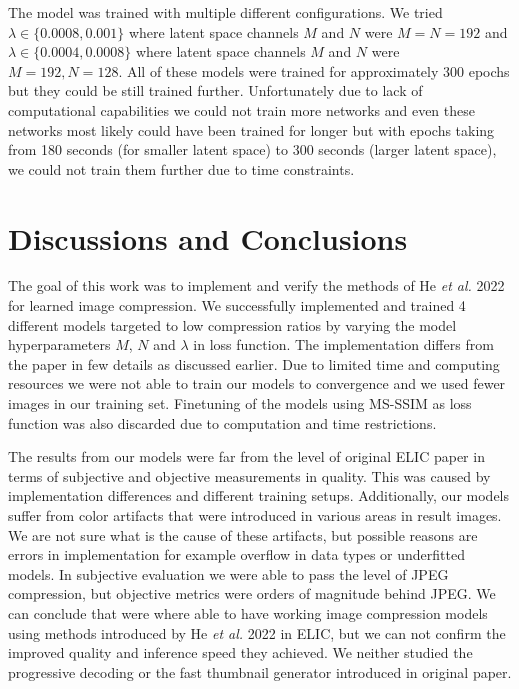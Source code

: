 \documentclass{article}
\begin{document}
The model was trained with multiple different configurations. We tried $\lambda \in \{0.0008, 0.001\}$ where latent space channels $M$ and $N$ were $M=N=192$ and $\lambda \in \{0.0004, 0.0008\}$ where latent space channels $M$ and $N$ were $M=192, N=128$.
All of these models were trained for approximately 300 epochs but they could be still trained further.
Unfortunately due to lack of computational capabilities we could not train more networks and even these networks most likely could have been trained for longer but with epochs taking from 180 seconds (for smaller latent space) to 300 seconds (larger latent space), we could not train them further due to time constraints.

\section{Discussions and Conclusions}
The goal of this work was to implement and verify the methods of He \textit{et al.} 2022 \cite{ELIC} for learned image compression. We successfully implemented and trained 4 different models targeted to low compression ratios by varying the model hyperparameters $M$, $N$ and $\lambda$ in loss function. The implementation differs from the paper in few details as discussed earlier. Due to limited time and computing resources we were not able to train our models to convergence and we used fewer images in our training set. Finetuning of the models using MS-SSIM as loss function was also discarded due to computation and time restrictions. 

The results from our models were far from the level of original ELIC paper in terms of subjective and objective measurements in quality. This was caused by implementation differences and different training setups. Additionally, our models suffer from color artifacts that were introduced in various areas in result images. We are not sure what is the cause of these artifacts, but possible reasons are errors in implementation for example overflow in data types or underfitted models. In subjective evaluation we were able to pass the level of JPEG compression, but objective metrics were orders of magnitude behind JPEG. We can conclude that were where able to have working image compression models using methods introduced by He \textit{et al.} 2022 \cite{ELIC} in ELIC, but we can not confirm the improved quality and inference speed they achieved. We neither studied the progressive decoding or the fast thumbnail generator introduced in original paper. 
\end{document}

